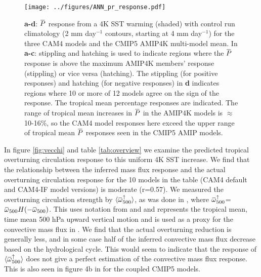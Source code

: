 \documentclass[letterpaper,12pt,titlepage,oneside,final]{book}
\newcommand{\overbar}[1]{\mkern 1.5mu\overline{\mkern-1.5mu#1\mkern-1.5mu}\mkern 1.5mu}
\begin{document}
\begin{figure}[H]
\centering
\noindent\texttt{[image: ../figures/ANN\_pr\_response.pdf]}\hfill
\caption{\footnotesize \textbf{a-d}: $\overbar{P}$ response from a 4K SST warming (shaded) with control run climatology (2 mm day$^{-1}$ contours, starting at 4 mm day$^{-1}$) for the three CAM4 models and the CMIP5 AMIP4K multi-model mean. In \textbf{a-c}: stippling and hatching is used to indicate regions where the $\overbar{P}$ response is above the maximum AMIP4K members' response (stippling) or vice versa (hatching). The stippling (for positive responses) and hatching (for negative responses) in \textbf{d} indicates regions where 10 or more of 12 models agree on the sign of the response. The tropical mean percentage responses are indicated. The range of tropical mean increases in $\overbar{P}$ in the AMIP4K models is $\approx$ 10-16\%, so the CAM4 model responses here exceed the upper range of tropical mean $\overbar{P}$ responses seen in the CMIP5 AMIP models.}
\label{fig:presponse}
\end{figure}

In figure \ref{fig:vecchi} and table \ref{tab:overview} we examine the predicted tropical overturning circulation response to this uniform 4K SST increase. We find that the relationship between the inferred mass flux response and the actual overturning circulation response for the 10 models in the table (CAM4 default and CAM4-IF model versions) is moderate (r=0.57). We measured the overturning circulation strength by $\langle\overbar{\omega}_{500}^{\uparrow}\rangle$, as was done in \citep{vecchi_weakening_2006}, where $\overbar{{\omega}}_{500}^{\uparrow}$=$\overbar{{\omega}}_{500}{H(-\overbar{\omega}_{500})}$. This uses notation from \cite{schneider_water_2010} and \cite{merlis_changes_2011} and represents the tropical mean, time mean 500 hPa upward vertical motion and is used as a proxy for the convective mass flux in \citep{vecchi_weakening_2006}. We find that the actual overturning reduction is generally less, and in some case half of the inferred convective mass flux decrease based on the hydrological cycle. This would seem to indicate that the response of $\langle\overbar{\omega}_{500}^{\uparrow}\rangle$ does not give a perfect estimation of the convective mass flux response. This is also seen in figure 4b in \citep{vecchi_global_2007} for the coupled CMIP5 models.
\end{document}
